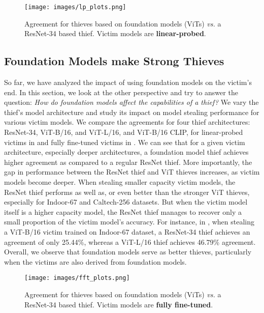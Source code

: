 {\begin{figure}[t]
	\centering
	\texttt{[image: images/lp\_plots.png]}
	\caption{Agreement for thieves based on foundation models (ViTs) \textit{vs.} a ResNet-34 based thief. Victim models are \textbf{linear-probed}. }
	\label{fig:lp_datasets}
\end{figure}

\subsection{Foundation Models make Strong Thieves}
So far, we have analyzed the impact of using foundation models on the victim's end. In this section, we look at the other perspective and try to answer the question: \emph{How do foundation models affect the capabilities of a thief?} 
We vary the thief's model architecture and study its impact on model stealing performance for various victim models. We compare the agreements for four thief architectures: ResNet-34, ViT-B/16, and ViT-L/16, and ViT-B/16 CLIP, for linear-probed victims in  and fully fine-tuned victims in . We can see that for a given victim architecture, especially deeper architectures, a foundation model thief achieves higher agreement as compared to a regular ResNet thief. More importantly, the gap in performance between the ResNet thief and ViT thieves increases, as victim models become deeper.
%
When stealing smaller capacity victim models, the ResNet thief performs as well as, or even better than the stronger ViT thieves, especially for Indoor-67 and Caltech-256 datasets. But when the victim model itself is a higher capacity model, the ResNet thief manages to recover only a small proportion of the victim model's accuracy. For instance, in , when stealing a ViT-B/16 victim trained on Indoor-67 dataset, a ResNet-34 thief achieves an agreement of only 25.44\%, whereas a ViT-L/16 thief achieves 46.79\% agreement. Overall, we observe that foundation models serve as better thieves, particularly when the victims are also derived from foundation models.

\begin{figure}[t]
	\centering
	\texttt{[image: images/fft\_plots.png]}
	\caption{Agreement for thieves based on foundation models (ViTs) \textit{vs.} a ResNet-34 based thief. Victim models are \textbf{fully fine-tuned}. }
	\label{fig:fft_datasets}
\end{figure}


}
